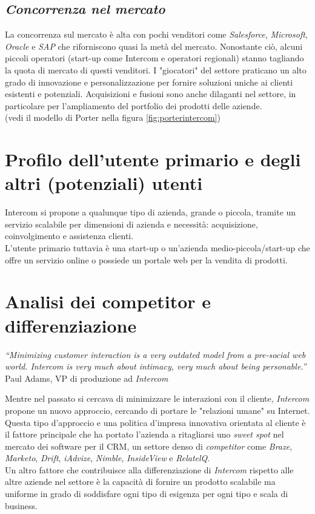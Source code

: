 \documentclass[a4paper, 11pt]{article}
\begin{document}
\subsection*{\textit{Concorrenza nel mercato}}
\par
La concorrenza sul mercato è alta con pochi venditori come \textit{Salesforce}, \textit{Microsoft}, \textit{Oracle} e \textit{SAP} che riforniscono quasi la metà del mercato. Nonostante ciò, alcuni piccoli operatori (start-up come Intercom e operatori regionali) stanno tagliando la quota di mercato di questi venditori. I "giocatori" del settore praticano un alto grado di innovazione e personalizzazione per fornire soluzioni uniche ai clienti esistenti e potenziali. Acquisizioni e fusioni sono anche dilaganti nel settore, in particolare per l'ampliamento del portfolio dei prodotti delle aziende.\cite{GVR} \\(vedi il modello di Porter nella figura \ref{fig:porterintercom})\\

\newpage\section*{Profilo dell’utente primario e degli altri (potenziali) utenti}
Intercom si propone a qualunque tipo di azienda, grande o piccola, tramite un servizio scalabile per dimensioni di azienda e necessità: acquisizione, coinvolgimento e assistenza clienti.\\
L'utente primario tuttavia è una start-up o un'azienda medio-piccola/start-up che offre un servizio online o possiede un portale web per la vendita di prodotti.\\

\section*{Analisi dei competitor e differenziazione}

\emph{“Minimizing customer interaction is a very outdated model from a pre-social web world. Intercom is very much about intimacy, very much about being personable.” \cite{tc2}} \\
\null \hfill Paul Adams, VP di produzione ad \textit{Intercom}\\ 
\par
Mentre nel passato si cercava di minimizzare le interazioni con il cliente, \textit{Intercom} propone un nuovo approccio, cercando di portare le "relazioni umane" su Internet.\\
Questa tipo d'approccio e una politica d'impresa innovativa orientata al cliente è il fattore principale che ha portato l'azienda a ritagliarsi uno \textit{sweet spot} nel mercato dei software per il CRM, un settore denso di \textit{competitor} come \textit{Braze}, \textit{Marketo}, \textit{Drift}, \textit{iAdvize}, \textit{Nimble}, \textit{InsideView} e \textit{RelatelQ}.\\
Un altro fattore che contribuisce alla differenziazione di \textit{Intercom} rispetto alle altre aziende nel settore è la capacità di fornire un prodotto scalabile ma uniforme in grado di soddisfare ogni tipo di esigenza per ogni tipo e scala di business.
\end{document}
